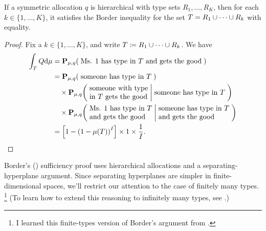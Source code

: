 \begin{lemma}
	\label{lemma:hier}
	If a symmetric allocation $q$ is hierarchical with type sets $R_1,\dots,R_K$,
	then for each $k \in \{1,\dots,K\}$,
	it satisfies the Border inequality for the set $T = R_1 \cup \cdots \cup R_k$ with equality.
\end{lemma}

\begin{proof}
	Fix a $k \in \{1,\dots,K\}$,
	and write $T \coloneqq R_1 \cup \cdots \cup R_k$.
	We have
	\begin{align*}
		\int_{T} Q \dd \mu
		&= \PP_{\mu,q}\left( \;\text{Ms. 1 has type in $T$ and gets the good}\; \right)
		\\
		&= \PP_{\mu,q}\left( \;\text{someone has type in $T$}\; \right)
		\\
		&\quad\times \PP_{\mu,q}\left( \;\parbox{\widthof{someone with type}}{someone with type in $T$ gets the good}\;
		\middle| \;\text{someone has type in $T$}\; \right)
		\\
		&\quad\times \PP_{\mu,q}\left( \;\parbox{\widthof{Ms. 1 has type in $T$}}{Ms. 1 has type in $T$ and gets the good}\;
		\middle|
		\;\parbox{\widthof{someone has type in $T$}}{someone has type in $T$ and gets the good}\; \right)
		\\
		&= \left[ 1 - \left( 1 - \mu(T) \right)^I \right] \times 1 \times \frac{1}{I} . \qedhere
	\end{align*}
\end{proof}


Border's (\citeyear{Border1991}) sufficiency proof
uses hierarchical allocations and a separating-hyperplane argument.
Since separating hyperplanes are simpler in finite-dimensional spaces,
we'll restrict our attention to the case of finitely many types.%
	\footnote{I learned this finite-types version of Border's argument from \textcite[§6.2.3]{Vohra2011}.}
(To learn how to extend this reasoning to infinitely many types, see \textcite{Border1991}.)

